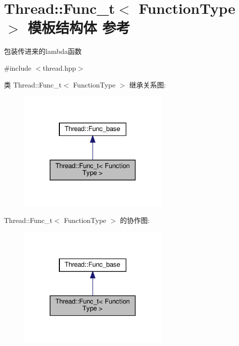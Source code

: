 \hypertarget{structThread_1_1Func__t}{}\section{Thread\+:\+:Func\+\_\+t$<$ Function\+Type $>$ 模板结构体 参考}
\label{structThread_1_1Func__t}


包装传进来的lambda函数  




{\ttfamily \#include $<$thread.\+hpp$>$}



类 Thread\+:\+:Func\+\_\+t$<$ Function\+Type $>$ 继承关系图\+:
\nopagebreak
\begin{figure}[H]
\begin{center}
\leavevmode
\includegraphics[width=209pt]{structThread_1_1Func__t__inherit__graph}
\end{center}
\end{figure}


Thread\+:\+:Func\+\_\+t$<$ Function\+Type $>$ 的协作图\+:
\nopagebreak
\begin{figure}[H]
\begin{center}
\leavevmode
\includegraphics[width=209pt]{structThread_1_1Func__t__coll__graph}
\end{center}
\end{figure}
